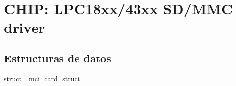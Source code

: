 \hypertarget{group___s_d_m_m_c__18_x_x__43_x_x}{}\section{C\+H\+IP\+: L\+P\+C18xx/43xx S\+D/\+M\+MC driver}
\label{group___s_d_m_m_c__18_x_x__43_x_x}
\subsection*{Estructuras de datos}
\begin{DoxyCompactItemize}
\item 
struct \hyperlink{struct__mci__card__struct}{\+\_\+mci\+\_\+card\+\_\+struct}
\end{DoxyCompactItemize}
